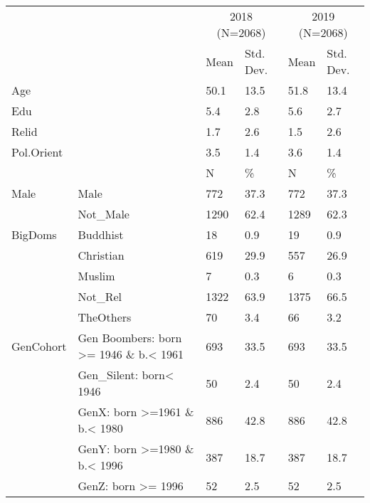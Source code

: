\begin{table}
\centering
\begin{tabular}[t]{llllll}
\toprule
\multicolumn{2}{c}{ } & \multicolumn{2}{c}{2018 (N=2068)} & \multicolumn{2}{c}{2019 (N=2068)} \\
\cmidrule(l{3pt}r{3pt}){3-4} \cmidrule(l{3pt}r{3pt}){5-6}
  &    & Mean & Std. Dev. & Mean  & Std. Dev. \\
\midrule
Age &  & 50.1 & 13.5 & 51.8 & 13.4\\
Edu &  & 5.4 & 2.8 & 5.6 & 2.7\\
Relid &  & 1.7 & 2.6 & 1.5 & 2.6\\
Pol.Orient &  & 3.5 & 1.4 & 3.6 & 1.4\\
\midrule
 &  & N & \% & N & \%\\
Male & Male & 772 & 37.3 & 772 & 37.3\\
 & Not\_Male & 1290 & 62.4 & 1289 & 62.3\\
BigDoms & Buddhist & 18 & 0.9 & 19 & 0.9\\
 & Christian & 619 & 29.9 & 557 & 26.9\\
 & Muslim & 7 & 0.3 & 6 & 0.3\\
 & Not\_Rel & 1322 & 63.9 & 1375 & 66.5\\
 & TheOthers & 70 & 3.4 & 66 & 3.2\\
GenCohort & Gen Boombers: born >= 1946 \& b.< 1961 & 693 & 33.5 & 693 & 33.5\\
 & Gen\_Silent: born< 1946 & 50 & 2.4 & 50 & 2.4\\
 & GenX: born >=1961 \& b.< 1980 & 886 & 42.8 & 886 & 42.8\\
 & GenY: born >=1980 \& b.< 1996 & 387 & 18.7 & 387 & 18.7\\
 & GenZ: born >= 1996 & 52 & 2.5 & 52 & 2.5\\
\bottomrule
\end{tabular}
\end{table}
